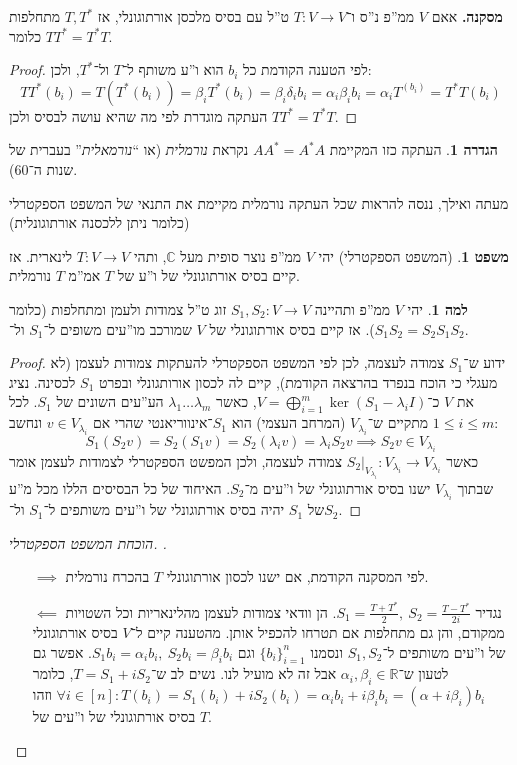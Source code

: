 \documentclass[a4paper]{article}
\newcommand\R     {\mathbb{R}}
\newcommand\C     {\mathbb{C}}
\newcommand\co        {\colon}
\newcommand\ag        {\alpha}
\newcommand\bg        {\beta}
\newcommand\dg        {\delta}
\renewcommand\lg      {\lambda}
\theoremstyle{definition}
\newtheorem{Theorem}{\color{myblue}משפט}
\newtheorem{Definition}{\color{mygreen}הגדרה}
\newtheorem{Lemma}{\color{myyellow}למה}
\newcommand\theo  [1] {\begin{Theorem}#1\end{Theorem}}
\newcommand\defi  [1] {\begin{Definition}#1\end{Definition}}
\newcommand\lem   [1] {\begin{Lemma}#1\end{Lemma}}
\begin{document}
	\textbf{מסקנה. }אאם $V$ ממ''פ נ''ס ו־$T \co V \to V$ ט''ל עם בסיס מלכסן אורתוגונלי, אז $T, T^*$ מתחלפות כלומר $TT^* = T^*T$. \begin{proof}
		לפי הטענה הקודמת כל $b_i$ הוא ו''ע משותף ל־$T$ ול־$T^*$, ולכן: 
		\[ TT^*(b_i) = T(T^*(b_i)) = \bg_i T^*(b_i) = \bg_i \dg_i b_i = \ag_i \bg_i b_i = \ag_i T^(b_i) = T^*T(b_i) \]
		העתקה מוגדרת לפי מה שהיא עושה לבסיס ולכן $TT^* = T^*T$. 
	\end{proof}
	\defi{העתקה כזו המקיימת $AA^* = A^*A$ נקראת \textit{נורמלית} (או ``\textit{נורמאלית}'' בעברית של שנות ה־60). }
	
	מעתה ואילך, ננסה להראות שכל העתקה נורמלית מקיימת את התנאי של המשפט הספקטרלי (כלומר ניתן ללכסנה אורתוגונלית)
	
	\theo{(המשפט הספקטרלי) יהי $V$ ממ''פ נוצר סופית מעל $\C$, ותהי $T \co V \to V$ לינארית. אז קיים בסיס אורתוגונלי של ו''ע של $T$ אמ''מ $T$ נורמלית. }
	\lem{יהי $V$ ממ''פ ותהיינה $S_1, S_2 \co V \to V$  זוג ט''ל צמודות ולעמן ומתחלפות (כלומר $S_1S_2 = S_2 S_1$). אז קיים בסיס אורתוגונלי של $V$ שמורכב מו''עים משופים ל־$S_1$ ול־$S_2$. }\begin{proof}
		ידוע ש־$S_1$ צמודה לעצמה, לכן לפי המשפט הספקטרלי להעתקות צמודות לעצמן (לא מעגלי כי הוכח בנפרד בהרצאה הקודמת), קיים לה לכסון אורותגונלי ובפרט $S_1$ לכסינה. נציג את $V$ כ־$V = \bigoplus_{i = 1}^{m} \ker(S_1 - \lg_iI)$, כאשר $\lg _1 \dots \lg_m$ הע''עים השונים של $S_1$. לכל $1 \le i \le m$  מתקיים ש־$V_{\lg_i}$ (המרחב העצמי) הוא $S_1$־אינווריאנטי שהרי אם $v \in V_{\lg_i}$ ונחשב: 
		\[ S_1(S_2 v) = S_2(S_1 v) = S_2(\lg_i v) = \lg _i S_2v \implies S_2 v \in V_{\lg_i} \]
		כאשר $S_2|_{V_{\lg _i}} \co V_{\lg_i} \to V_{\lg_i}$ צמודה לעצמה, ולכן המפשט הספקטרלי לצמודות לעצמן אומר שבתוך $V_{\lg_i}$ ישנו בסיס אורתוגונלי של ו''עים מ־$S_2$. האיחוד של כל הבסיסים הללו מכל מ''ע של $S_1$ יהיה בסיס אורתוגונלי של ו''עים משותפים ל־$S_1$ ול־$S_2$. 
	\end{proof}
	\begin{proof}[הוכחת המשפט הספקטרלי. ]\,
		\begin{itemize}
			\item[$\implies$] לפי המסקנה הקודמת, אם ישנו לכסון אורתוגונלי $T$ בהכרח נורמלית. 
			\item[$\impliedby$] נגדיר $S_1 = \frac{T + T^*}{2}, \ S_2 = \frac{T - T^*}{2i}$. הן וודאי צמודות לעצמן מהלינאריות וכל השטויות ממקודם, והן גם מתחלפות אם תטרחו להכפיל אותן. מהטענה קיים ל־$V$ בסיס אורתוגונלי של ו''עים משותפים ל־$S_1, S_2$ ונסמנו $\{b_i\}^{n}_{i = 1}$ וגם $S_1b_i = \ag_i b_i, \ S_2b_i= \bg_i b_i$. אפשר גם לטעון ש־$\ag_i, \bg_i \in \R$ אבל זה לא מועיל לנו. נשים לב ש־$T = S_1 + iS_2$, כלומר $\forall i \in [n] \co T(b_i) = S_1(b_i) + iS_2(b_i) = \ag_i b_i + i\bg_i b_i = (\ag + i\bg_i)b_i$ וזהו בסיס אורתוגונלי של ו''עים של $T$. 
		\end{itemize}
	\end{proof}
	
\end{document}
